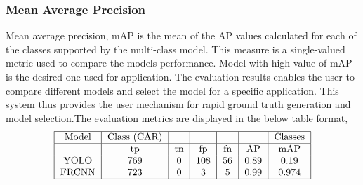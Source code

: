 \documentclass[conference]{IEEEtran}
\newcommand{\figwidthb}{0.80\linewidth}
\begin{document}

\subsubsection{Mean Average Precision}
	Mean average precision, {mAP} is the mean of the {AP} values calculated for each of the classes supported by the multi-class model. This measure is a single-valued metric used to compare the models performance. Model with high value of {mAP} is the desired one used for application. The evaluation results enables the user to compare different models and select the model for a specific application. This system thus provides the user mechanism for rapid ground truth generation and model selection.The evaluation metrics are displayed in the below table format,
\begin{align}
\begin{tabular}{| c | c | c | c | c | c | c | }
\hline
Model & Class (CAR) & & & & & Classes \\ 
\hline 
     & tp & tn & fp & fn & AP & mAP \\ 
YOLO & 769 & 0 &  108 & 56 & 0.89 & 0.19  \\
FRCNN & 723 & 0 & 3 & 5 & 0.99 & 0.974 \\
\hline
\end{tabular}
\end{align}
\end{document}
